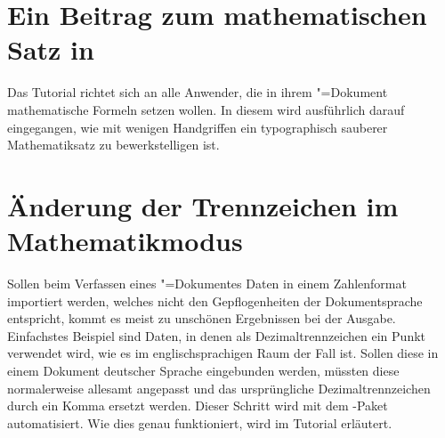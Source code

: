 \section{Ein Beitrag zum mathematischen Satz in }
\label{sec:exmpl:mathtype}
Das Tutorial  richtet sich an alle Anwender, die in ihrem 
"=Dokument mathematische Formeln setzen wollen. In diesem wird 
ausführlich darauf eingegangen, wie mit wenigen Handgriffen ein typographisch 
sauberer Mathematiksatz zu bewerkstelligen ist.
\section{Änderung der Trennzeichen im Mathematikmodus}
\label{sec:exmpl:mathswap}
Sollen beim Verfassen eines "=Dokumentes Daten in einem 
Zahlenformat importiert werden, welches nicht den Gepflogenheiten der 
Dokumentsprache entspricht, kommt es meist zu unschönen Ergebnissen bei der 
Ausgabe. Einfachstes Beispiel sind Daten, in denen als Dezimaltrennzeichen ein 
Punkt verwendet wird, wie es im englischsprachigen Raum der Fall ist. Sollen 
diese in einem Dokument deutscher Sprache eingebunden werden, müssten diese 
normalerweise allesamt angepasst und das ursprüngliche Dezimaltrennzeichen 
durch ein Komma ersetzt werden. Dieser Schritt wird mit dem \TUDScript-Paket 
 automatisiert. Wie dies genau funktioniert, wird im Tutorial 
 erläutert.
